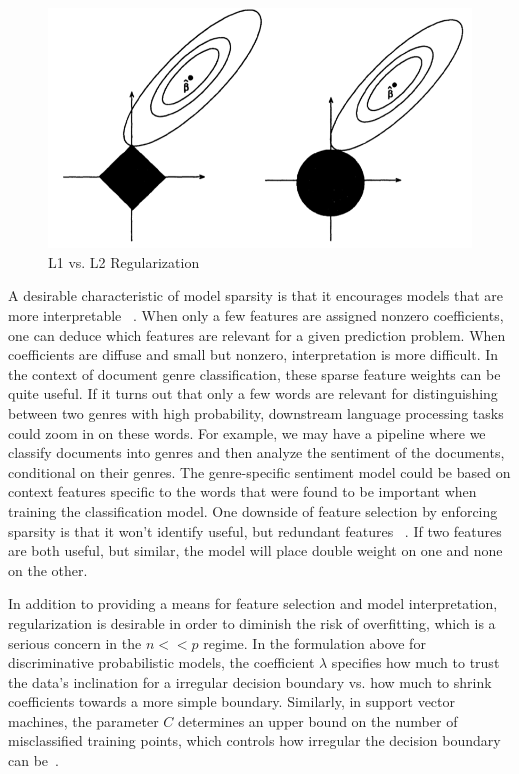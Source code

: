 \documentclass[]{article}
\begin{document}
\begin{center}
\begin{figure}[h!] 
\centering
\includegraphics[width=.5\textwidth]{../images/sparsity.png}
\caption{L1 vs. L2 Regularization}
\label{fig:sparsity}
\end{figure}
\end{center}

	A desirable characteristic of model sparsity is that it encourages models that are more interpretable  ~\cite{tibshirani1996regression}. When only a few features are assigned nonzero coefficients, one can deduce which features are relevant for a given prediction problem. When coefficients are diffuse and small but nonzero, interpretation is more difficult. In the context of document genre classification, these sparse feature weights can be quite useful. If it turns out that only a few words are relevant for distinguishing between two genres with high probability, downstream language processing tasks could zoom in on these words. For example, we may have a pipeline where we classify documents into genres and then analyze the sentiment of the documents, conditional on their genres. The genre-specific sentiment model could be based on context features specific to the words that were found to be important when training the classification model. One downside of feature selection by enforcing sparsity is that it won't identify useful, but redundant features ~\cite{LectureL1}. If two features are both useful, but similar, the model will place double weight on one and none on the other. 

	In addition to providing a means for feature selection and model interpretation, regularization is desirable in order to diminish the risk of overfitting, which is a serious concern in the $n << p$ regime. In the formulation above for discriminative probabilistic models, the coefficient $\lambda$ specifies how much to trust the data's inclination for a irregular decision boundary vs. how much to shrink coefficients towards a more simple boundary. Similarly, in support vector machines, the parameter $C$ determines an upper bound on the number of misclassified training points, which controls how irregular the decision boundary can be~\cite[332]{Bishop}.
\end{document}

